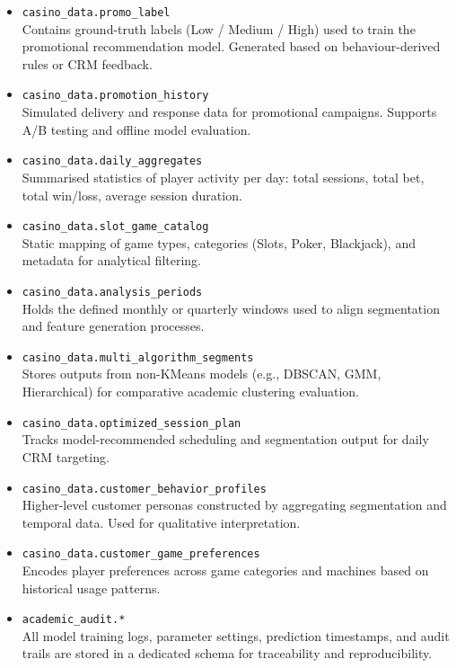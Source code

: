 \documentclass[12pt,a4paper]{report}
\begin{document}
\begin{itemize}
\item \texttt{casino\_data.promo\_label} \\
Contains ground-truth labels (Low / Medium / High) used to train the promotional recommendation model. Generated based on behaviour-derived rules or CRM feedback.

\item \texttt{casino\_data.promotion\_history} \\
Simulated delivery and response data for promotional campaigns. Supports A/B testing and offline model evaluation.

\item \texttt{casino\_data.daily\_aggregates} \\
Summarised statistics of player activity per day: total sessions, total bet, total win/loss, average session duration.

\item \texttt{casino\_data.slot\_game\_catalog} \\
Static mapping of game types, categories (Slots, Poker, Blackjack), and metadata for analytical filtering.

\item \texttt{casino\_data.analysis\_periods} \\
Holds the defined monthly or quarterly windows used to align segmentation and feature generation processes.

\item \texttt{casino\_data.multi\_algorithm\_segments} \\
Stores outputs from non-KMeans models (e.g., DBSCAN, GMM, Hierarchical) for comparative academic clustering evaluation.

\item \texttt{casino\_data.optimized\_session\_plan} \\
Tracks model-recommended scheduling and segmentation output for daily CRM targeting.

\item \texttt{casino\_data.customer\_behavior\_profiles} \\
Higher-level customer personas constructed by aggregating segmentation and temporal data. Used for qualitative interpretation.

\item \texttt{casino\_data.customer\_game\_preferences} \\
Encodes player preferences across game categories and machines based on historical usage patterns.

\item \texttt{academic\_audit.*} \\
All model training logs, parameter settings, prediction timestamps, and audit trails are stored in a dedicated schema for traceability and reproducibility.

\end{itemize}
\end{document}
